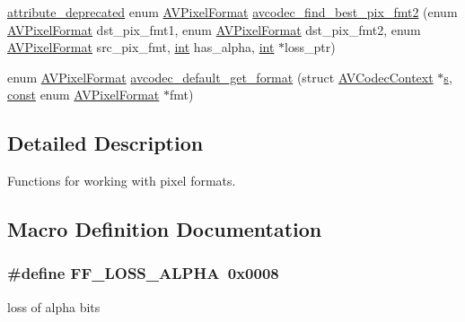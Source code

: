 \begin{DoxyCompactItemize}
\item 
\hyperlink{attributes_8h_aa6d076561d3a9eea4729ee632652de02}{attribute\+\_\+deprecated} enum \hyperlink{pixfmt_8h_a9a8e335cf3be472042bc9f0cf80cd4c5}{A\+V\+Pixel\+Format} \hyperlink{group__lavc__misc__pixfmt_gafaa40af15ce2d1ab4adca12b827ee85f}{avcodec\+\_\+find\+\_\+best\+\_\+pix\+\_\+fmt2} (enum \hyperlink{pixfmt_8h_a9a8e335cf3be472042bc9f0cf80cd4c5}{A\+V\+Pixel\+Format} dst\+\_\+pix\+\_\+fmt1, enum \hyperlink{pixfmt_8h_a9a8e335cf3be472042bc9f0cf80cd4c5}{A\+V\+Pixel\+Format} dst\+\_\+pix\+\_\+fmt2, enum \hyperlink{pixfmt_8h_a9a8e335cf3be472042bc9f0cf80cd4c5}{A\+V\+Pixel\+Format} src\+\_\+pix\+\_\+fmt, \hyperlink{xmltok_8h_a5a0d4a5641ce434f1d23533f2b2e6653}{int} has\+\_\+alpha, \hyperlink{xmltok_8h_a5a0d4a5641ce434f1d23533f2b2e6653}{int} $\ast$loss\+\_\+ptr)
\item 
enum \hyperlink{pixfmt_8h_a9a8e335cf3be472042bc9f0cf80cd4c5}{A\+V\+Pixel\+Format} \hyperlink{group__lavc__misc__pixfmt_ga2d16136bf8844295b2f8ea17c386d833}{avcodec\+\_\+default\+\_\+get\+\_\+format} (struct \hyperlink{struct_a_v_codec_context}{A\+V\+Codec\+Context} $\ast$\hyperlink{lib_2expat_8h_a755339d27872b13735c2cab829e47157}{s}, \hyperlink{getopt1_8c_a2c212835823e3c54a8ab6d95c652660e}{const} enum \hyperlink{pixfmt_8h_a9a8e335cf3be472042bc9f0cf80cd4c5}{A\+V\+Pixel\+Format} $\ast$fmt)
\end{DoxyCompactItemize}


\subsection{Detailed Description}
Functions for working with pixel formats. 

\subsection{Macro Definition Documentation}
\subsubsection[{\texorpdfstring{F\+F\+\_\+\+L\+O\+S\+S\+\_\+\+A\+L\+P\+HA}{FF_LOSS_ALPHA}}]{\setlength{\rightskip}{0pt plus 5cm}\#define F\+F\+\_\+\+L\+O\+S\+S\+\_\+\+A\+L\+P\+HA~0x0008}\hypertarget{group__lavc__misc__pixfmt_ga5e5683a0c698af4701cc768f2944b6f4}{}\label{group__lavc__misc__pixfmt_ga5e5683a0c698af4701cc768f2944b6f4}
loss of alpha bits 

